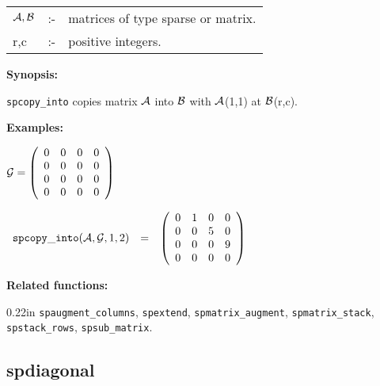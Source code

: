\hspace*{0.1in} 
\begin{tabular}{l l l}
${\cal A,B}$ &:-& matrices of type sparse or matrix. \\
r,c          &:-& positive integers. 
\end{tabular}

{\bf Synopsis:} %

\hspace*{0.175in} {\tt spcopy\_into} copies matrix ${\cal A}$ into 
                ${\cal B}$ with ${\cal A}$(1,1) at ${\cal B}$(r,c).

{\bf Examples:} 

\begin{flushleft}
\hspace*{0.175in}
\begin{math}  
{\cal G} = \left( \begin{array}{cccc} 0 & 0 & 0 & 0 \\ 0 & 0 & 0 & 0 \\
0 & 0 & 0 & 0 \\ 0 & 0 & 0 & 0
\end{array} \right)
\end{math}  
\end{flushleft}

\begin{flushleft}
\hspace*{0.1in}
\begin{math}  
\begin{array}{ccc}
{\tt spcopy\_into}({\cal A,G},1,2) & = & 
\left( \begin{array}{cccc} 0 & 1 & 0 & 0 \\ 0 & 0 & 5 & 0 \\ 0 & 0 & 0 
& 9 \\ 0 & 0 & 0 & 0  
\end{array} \right)
\end{array}
\end{math}  
\end{flushleft}

{\bf Related functions:} 

\begin{addtolength}{\leftskip}{0.22in}
{\tt spaugment\_columns}, {\tt spextend}, {\tt spmatrix\_augment}, 
{\tt spmatrix\_stack}, {\tt spstack\_rows}, {\tt spsub\_matrix}.

\end{addtolength}


\subsection{spdiagonal}

